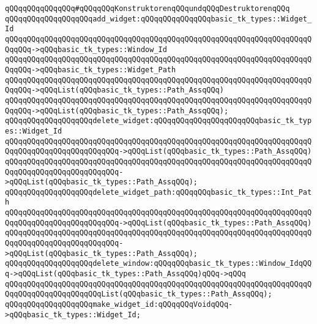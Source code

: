 \newline
\verb|qQQqqQQqqQQqqQQq#qQQqqQQqKonstruktorenqQQqundqQQqDestruktorenqQQq|\newline
\verb|qQQqqQQqqQQqqQQqqQQqadd_widget:qQQqqQQqqQQqqQQqbasic_tk_types::Widget_Id|\newline
\verb|qQQqqQQqqQQqqQQqqQQqqQQqqQQqqQQqqQQqqQQqqQQqqQQqqQQqqQQqqQQqqQQqqQQqqQQqqQQq->qQQqbasic_tk_types::Window_Id|\newline
\verb|qQQqqQQqqQQqqQQqqQQqqQQqqQQqqQQqqQQqqQQqqQQqqQQqqQQqqQQqqQQqqQQqqQQqqQQqqQQq->qQQqbasic_tk_types::Widget_Path|\newline
\verb|qQQqqQQqqQQqqQQqqQQqqQQqqQQqqQQqqQQqqQQqqQQqqQQqqQQqqQQqqQQqqQQqqQQqqQQqqQQq->qQQqList(qQQqbasic_tk_types::Path_AssqQQq)|\newline
\verb|qQQqqQQqqQQqqQQqqQQqqQQqqQQqqQQqqQQqqQQqqQQqqQQqqQQqqQQqqQQqqQQqqQQqqQQqqQQq->qQQqList(qQQqbasic_tk_types::Path_AssqQQq);|\newline
\newline
\verb|qQQqqQQqqQQqqQQqqQQqdelete_widget:qQQqqQQqqQQqqQQqqQQqqQQqbasic_tk_types::Widget_Id|\newline
\verb|qQQqqQQqqQQqqQQqqQQqqQQqqQQqqQQqqQQqqQQqqQQqqQQqqQQqqQQqqQQqqQQqqQQqqQQqqQQqqQQqqQQqqQQqqQQqqQQq->qQQqList(qQQqbasic_tk_types::Path_AssqQQq)|\newline
\verb|qQQqqQQqqQQqqQQqqQQqqQQqqQQqqQQqqQQqqQQqqQQqqQQqqQQqqQQqqQQqqQQqqQQqqQQqqQQqqQQqqQQqqQQqqQQqqQQq->qQQqList(qQQqbasic_tk_types::Path_AssqQQq);|\newline
\newline
\verb|qQQqqQQqqQQqqQQqqQQqdelete_widget_path:qQQqqQQqbasic_tk_types::Int_Path|\newline
\verb|qQQqqQQqqQQqqQQqqQQqqQQqqQQqqQQqqQQqqQQqqQQqqQQqqQQqqQQqqQQqqQQqqQQqqQQqqQQqqQQqqQQqqQQqqQQqqQQq->qQQqList(qQQqbasic_tk_types::Path_AssqQQq)|\newline
\verb|qQQqqQQqqQQqqQQqqQQqqQQqqQQqqQQqqQQqqQQqqQQqqQQqqQQqqQQqqQQqqQQqqQQqqQQqqQQqqQQqqQQqqQQqqQQqqQQq->qQQqList(qQQqbasic_tk_types::Path_AssqQQq);|\newline
\newline
\verb|qQQqqQQqqQQqqQQqqQQqdelete_window:qQQqqQQqbasic_tk_types::Window_IdqQQq->qQQqList(qQQqbasic_tk_types::Path_AssqQQq)qQQq->qQQq|\newline
\verb|qQQqqQQqqQQqqQQqqQQqqQQqqQQqqQQqqQQqqQQqqQQqqQQqqQQqqQQqqQQqqQQqqQQqqQQqqQQqqQQqqQQqqQQqqQQqList(qQQqbasic_tk_types::Path_AssqQQq);|\newline
\newline
\verb|qQQqqQQqqQQqqQQqqQQqmake_widget_id:qQQqqQQqVoidqQQq->qQQqbasic_tk_types::Widget_Id;|\newline
